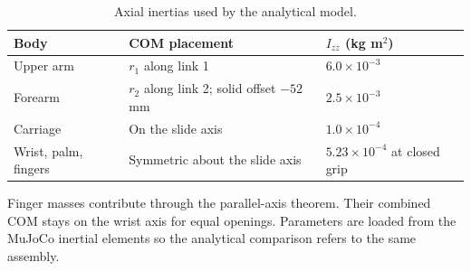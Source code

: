 \documentclass[11pt,a4paper]{article}
\begin{document}
\begin{table}[htbp]\centering
\caption{Axial inertias used by the analytical model.}\label{tab:inertia}
\begin{tabular}{@{}lll@{}}\toprule
Body & COM placement & $I_{zz}$ (kg m$^2$)\\\midrule
Upper arm & $r_1$ along link 1 & $6.0\times10^{-3}$\\
Forearm & $r_2$ along link 2; solid offset $-52$ mm & $2.5\times10^{-3}$\\
Carriage & On the slide axis & $1.0\times10^{-4}$\\
Wrist, palm, fingers & Symmetric about the slide axis & $5.23\times10^{-4}$ at closed grip\\
\bottomrule\end{tabular}\end{table}

Finger masses contribute through the parallel-axis theorem. Their combined
COM stays on the wrist axis for equal openings. Parameters are loaded from
the MuJoCo inertial elements so the analytical comparison refers to the
same assembly.
\end{document}

